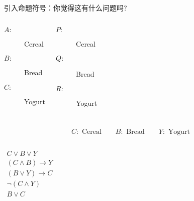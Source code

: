 \begin{frame}{}
  引入命题符号：你觉得这有什么问题吗?
  \begin{columns}
      \begin{description}
	\item[$A:$] Cereal
	\item[$B:$] Bread
	\item[$C:$] Yogurt
      \end{description}
      \begin{description}
	\item[$P:$] Cereal
	\item[$Q:$] Bread
	\item[$R:$] Yogurt
      \end{description}
  \end{columns}

  \pause
  \vspace{0.30cm}
\end{frame}

\begin{frame}{}
  \[
    C: \text{ Cereal} \qquad B: \text{ Bread} \qquad Y: \text{ Yogurt}
  \]

  \pause
  \begin{columns}
      \begin{gather}
	C \lor B \lor Y \\
	(C \land B) \to Y \\
	(B \lor Y) \to C \\
	\lnot (C \land Y) \\
	B \lor C
      \end{gather}
  \end{columns}

  \pause
  \vspace{0.80cm}
  \begin{quote}
    \centerline{}
  \end{quote}
\end{frame}
